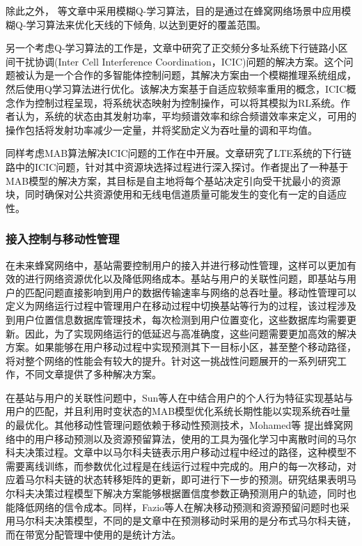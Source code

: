 \documentclass{IEEEtran}
\begin{document}
除此之外，\cite{Razavi2010}\cite{Razavi2010a}\cite{Islam2012} 等文章中采用模糊Q-学习算法，目的是通过在蜂窝网络场景中应用模糊Q-学习算法来优化天线的下倾角, 以达到更好的覆盖范围。

另一个考虑Q-学习算法的工作是\cite{Dirani2010}，文章中研究了正交频分多址系统下行链路小区间干扰协调(Inter Cell Interference Coordination，ICIC)问题的解决方案。这个问题被认为是一个合作的多智能体控制问题，其解决方案由一个模糊推理系统组成，然后使用Q学习算法进行优化。该解决方案基于自适应软频率重用的概念，ICIC概念作为控制过程呈现，将系统状态映射为控制操作，可以将其模拟为RL系统。作者认为，系统的状态由其发射功率，平均频谱效率和综合频谱效率来定义，可用的操作包括将发射功率减少一定量，并将奖励定义为吞吐量的调和平均值。

同样考虑MAB算法解决ICIC问题的工作在\cite{Coucheney2015}中开展。文章研究了LTE系统的下行链路中的ICIC问题，针对其中资源块选择过程进行深入探讨。作者提出了一种基于MAB模型的解决方案，其目标是自主地将每个基站决定引向受干扰最小的资源块，同时确保对公共资源使用和无线电信道质量可能发生的变化有一定的自适应性。



\subsubsection{接入控制与移动性管理}
在未来蜂窝网络中，基站需要控制用户的接入并进行移动性管理，这样可以更加有效的进行网络资源优化以及降低网络成本。基站与用户的关联性问题，即基站与用户的匹配问题直接影响到用户的数据传输速率与网络的总吞吐量。移动性管理可以定义为网络运行过程中管理用户在移动过程中切换基站等行为的过程，该过程涉及到用户位置信息数据库管理技术，每次检测到用户位置变化，这些数据库均需要更新。因此，为了实现网络运行的低延迟与高准确度，这些问题需要更加高效的解决方案。如果能够在用户移动过程中实现预测其下一目标小区，甚至整个移动路径，将对整个网络的性能会有较大的提升。针对这一挑战性问题展开的一系列研究工作，不同文章提供了多种解决方案。

在基站与用户的关联性问题中，Sun等人在\cite{Sun2017}中结合用户的个人行为特征实现基站与用户的匹配，并且利用时变状态的MAB模型优化系统长期性能以实现系统吞吐量的最优化。其他移动性管理问题依赖于移动性预测技术，Mohamed等\cite{Mohamed2015} 提出蜂窝网络中的用户移动预测以及资源预留算法，使用的工具为强化学习中离散时间的马尔科夫决策过程。文章中以马尔科夫链表示用户移动过程中经过的路径，这种模型不需要离线训练，而参数优化过程是在线运行过程中完成的。用户的每一次移动，对应着马尔科夫链的状态转移矩阵的更新，即可进行下一步的预测。研究结果表明马尔科夫决策过程模型下解决方案能够根据置信度参数正确预测用户的轨迹，同时也能降低网络的信令成本。同样，Fazio等人\cite{Fazio2013}在解决移动预测和资源预留问题时也采用马尔科夫决策模型，不同的是文章中在预测移动时采用的是分布式马尔科夫链，而在带宽分配管理中使用的是统计方法。
\end{document}
